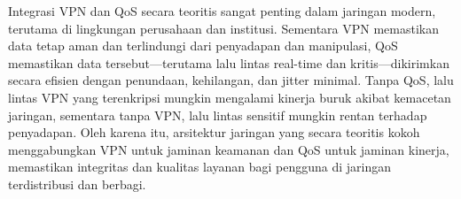 Integrasi VPN dan QoS secara teoritis sangat penting dalam jaringan modern, terutama di lingkungan perusahaan dan institusi. Sementara VPN memastikan data tetap aman dan terlindungi dari penyadapan dan manipulasi, QoS memastikan data tersebut—terutama lalu lintas real-time dan kritis—dikirimkan secara efisien dengan penundaan, kehilangan, dan jitter minimal. Tanpa QoS, lalu lintas VPN yang terenkripsi mungkin mengalami kinerja buruk akibat kemacetan jaringan, sementara tanpa VPN, lalu lintas sensitif mungkin rentan terhadap penyadapan. Oleh karena itu, arsitektur jaringan yang secara teoritis kokoh menggabungkan VPN untuk jaminan keamanan dan QoS untuk jaminan kinerja, memastikan integritas dan kualitas layanan bagi pengguna di jaringan terdistribusi dan berbagi. 

